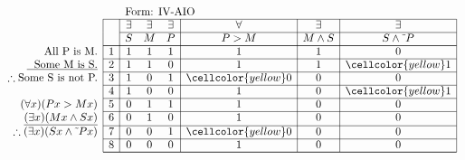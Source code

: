 \documentclass[10pt,legalpaper,landscape,cmtt]{article}
\begin{document}
{\begin{minipage}[t]{3.25in}
	\)
\end{minipage}\begin{minipage}[t]{3.25in}
	\(
	\begin{array}{r|c|ccc|c|c|c|}
		\multicolumn{2}{c}{}&\multicolumn{6}{l}{\mbox{Form: IV-AIO}} \\ \cline{2-8}
		\hspace{1in}	&	& \exists & \exists & \exists & \forall & \exists & \exists\\ \cline{3-8}
		&	& S & M & P &  P > M  &  M \wedge S  &  S \wedge \tilde~P \\ \cline{2-8} \cline{2-8}
		\phantom{\therefore}\mbox{All P is M.}   & 1 & 1 & 1 & 1 &   1   &   1   &   0  \\ \cline{2-8}
		\underline{\phantom{\therefore}\mbox{Some M is S.}}   & 2 & 1 & 1 & 0 &   1   &   1   &   \cellcolor{yellow} 1  \\ \cline{2-8}
		\therefore \mbox{Some S is not P.}   & 3 & 1 & 0 & 1 &   \cellcolor{yellow} 0   &   0   &   0  \\ \cline{2-8}
		& 4 & 1 & 0 & 0 &   1   &   0   &   \cellcolor{yellow} 1  \\ \cline{2-8}
		(\forall x)(Px > Mx)   & 5 & 0 & 1 & 1 &   1   &   0   &   0  \\ \cline{2-8}
		\underline{(\exists x)(Mx \wedge Sx)}   & 6 & 0 & 1 & 0 &   1   &   0   &   0  \\ \cline{2-8}
		\therefore(\exists x)(Sx \wedge \tilde~Px)   & 7 & 0 & 0 & 1 &   \cellcolor{yellow} 0   &   0   &   0  \\ \cline{2-8}
		& 8 & 0 & 0 & 0 &   1   &   0   &   0   \\ \cline{2-8}\cline{2-8} 
	\end{array}
	\)
\end{minipage}

\newpage %

}
\end{document}
